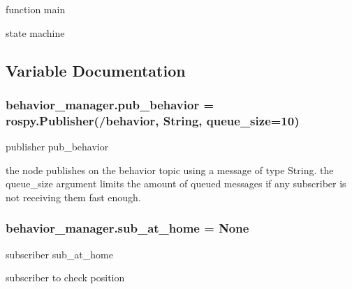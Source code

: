 function main 

state machine 

\subsection{Variable Documentation}
\subsubsection[{\texorpdfstring{pub\+\_\+behavior}{pub_behavior}}]{\setlength{\rightskip}{0pt plus 5cm}behavior\+\_\+manager.\+pub\+\_\+behavior = rospy.\+Publisher(\textquotesingle{}/behavior\textquotesingle{}, String, queue\+\_\+size=10)}\hypertarget{namespacebehavior__manager_ac30069bca00035c62a13df72bf29a3aa}{}\label{namespacebehavior__manager_ac30069bca00035c62a13df72bf29a3aa}


publisher pub\+\_\+behavior 

the node publishes on the behavior topic using a message of type String. the queue\+\_\+size argument limits the amount of queued messages if any subscriber is not receiving them fast enough. 
\subsubsection[{\texorpdfstring{sub\+\_\+at\+\_\+home}{sub_at_home}}]{\setlength{\rightskip}{0pt plus 5cm}behavior\+\_\+manager.\+sub\+\_\+at\+\_\+home = None}\hypertarget{namespacebehavior__manager_a8afd6b619b6a5d13a7f4bd0fe1d4c3b2}{}\label{namespacebehavior__manager_a8afd6b619b6a5d13a7f4bd0fe1d4c3b2}


subscriber sub\+\_\+at\+\_\+home 

subscriber to check position 